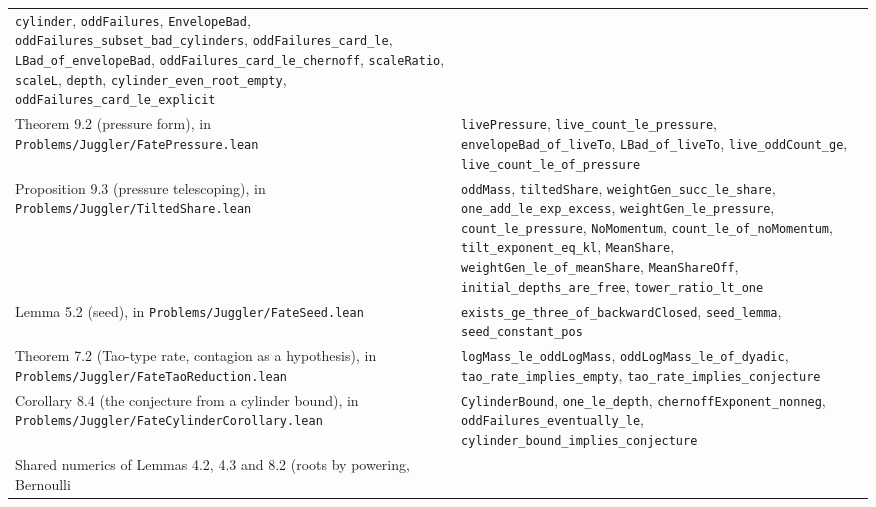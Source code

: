 \documentclass[11pt,a4paper]{article}
\begin{document}
\begin{longtable}[]{@{}
  >{\raggedright\arraybackslash}p{}
  >{\raggedright\arraybackslash}p{}@{}}
\texttt{\nolinkurl{cylinder}}, \texttt{\nolinkurl{oddFailures}},
\texttt{\nolinkurl{EnvelopeBad}},
\texttt{\nolinkurl{oddFailures_subset_bad_cylinders}},
\texttt{\nolinkurl{oddFailures_card_le}},
\texttt{\nolinkurl{LBad_of_envelopeBad}},
\texttt{\nolinkurl{oddFailures_card_le_chernoff}},
\texttt{\nolinkurl{scaleRatio}}, \texttt{\nolinkurl{scaleL}},
\texttt{\nolinkurl{depth}},
\texttt{\nolinkurl{cylinder_even_root_empty}},
\texttt{\nolinkurl{oddFailures_card_le_explicit}} \\
Theorem 9.2 (pressure form), in
\texttt{\nolinkurl{Problems/Juggler/FatePressure.lean}} &
\texttt{\nolinkurl{livePressure}},
\texttt{\nolinkurl{live_count_le_pressure}},
\texttt{\nolinkurl{envelopeBad_of_liveTo}},
\texttt{\nolinkurl{LBad_of_liveTo}},
\texttt{\nolinkurl{live_oddCount_ge}},
\texttt{\nolinkurl{live_count_le_of_pressure}} \\
Proposition 9.3 (pressure telescoping), in
\texttt{\nolinkurl{Problems/Juggler/TiltedShare.lean}} &
\texttt{\nolinkurl{oddMass}}, \texttt{\nolinkurl{tiltedShare}},
\texttt{\nolinkurl{weightGen_succ_le_share}},
\texttt{\nolinkurl{one_add_le_exp_excess}},
\texttt{\nolinkurl{weightGen_le_pressure}},
\texttt{\nolinkurl{count_le_pressure}}, \texttt{\nolinkurl{NoMomentum}},
\texttt{\nolinkurl{count_le_of_noMomentum}},
\texttt{\nolinkurl{tilt_exponent_eq_kl}},
\texttt{\nolinkurl{MeanShare}},
\texttt{\nolinkurl{weightGen_le_of_meanShare}},
\texttt{\nolinkurl{MeanShareOff}},
\texttt{\nolinkurl{initial_depths_are_free}},
\texttt{\nolinkurl{tower_ratio_lt_one}} \\
Lemma 5.2 (seed), in \texttt{\nolinkurl{Problems/Juggler/FateSeed.lean}}
& \texttt{\nolinkurl{exists_ge_three_of_backwardClosed}},
\texttt{\nolinkurl{seed_lemma}},
\texttt{\nolinkurl{seed_constant_pos}} \\
Theorem 7.2 (Tao-type rate, contagion as a hypothesis), in
\texttt{\nolinkurl{Problems/Juggler/FateTaoReduction.lean}} &
\texttt{\nolinkurl{logMass_le_oddLogMass}},
\texttt{\nolinkurl{oddLogMass_le_of_dyadic}},
\texttt{\nolinkurl{tao_rate_implies_empty}},
\texttt{\nolinkurl{tao_rate_implies_conjecture}} \\
Corollary 8.4 (the conjecture from a cylinder bound), in
\texttt{\nolinkurl{Problems/Juggler/FateCylinderCorollary.lean}} &
\texttt{\nolinkurl{CylinderBound}}, \texttt{\nolinkurl{one_le_depth}},
\texttt{\nolinkurl{chernoffExponent_nonneg}},
\texttt{\nolinkurl{oddFailures_eventually_le}},
\texttt{\nolinkurl{cylinder_bound_implies_conjecture}} \\
Shared numerics of Lemmas 4.2, 4.3 and 8.2 (roots by powering, Bernoulli

\end{longtable}
\end{document}
